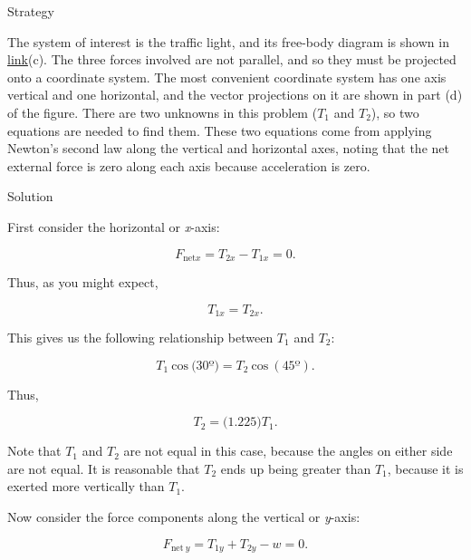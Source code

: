 \documentclass[
]{book}
\newenvironment{tinysection}{}{}
\begin{document}
\begin{tinysection}

{Strategy}

\end{tinysection}

The system of interest is the traffic light, and its free-body diagram
is shown in \protect\hyperlink{import-auto-id3051538}{link}(c).
The three forces involved are not parallel, and so they must be
projected onto a coordinate system. The most convenient coordinate
system has one axis vertical and one horizontal, and the vector
projections on it are shown in part (d) of the figure. There are two
unknowns in this problem (\(T_{1}{}\) and \(T_{2}{}\)), so two equations are
needed to find them. These two equations come from applying Newton's
second law along the vertical and horizontal axes, noting that the net
external force is zero along each axis because acceleration is zero.

\begin{tinysection}

{Solution}

\end{tinysection}

First consider the horizontal or \emph{x}-axis:

\leavevmode\hypertarget{eip-id2514755}{}%
\[{{F_{\text{net}x} = {T_{\text{2}x} - T_{\text{1}x}}} = 0}.\]

Thus, as you might expect,

\leavevmode\hypertarget{eip-id2540452}{}%
\[{T_{\text{1}x} = T_{\text{2}x}}.\]

This gives us the following relationship between \(T_{1}{}\) and
\(T_{2}{}\):

\leavevmode\hypertarget{eip-id2122298}{}%
\[{T_{1}\ \text{cos}\ (\text{30º}{) = T_{2}}\ \text{cos}\ (\text{45º})}.\]

Thus,

\leavevmode\hypertarget{eip-id2577136}{}%
\[{{T_{2} = (}1\text{.}\text{225})T_{1}}.\]

Note that \(T_{1}{}\) and \(T_{2}{}\) are not equal in this case, because
the angles on either side are not equal. It is reasonable that \(T_{2}{}\)
ends up being greater than \(T_{1}{}\), because it is exerted more
vertically than \(T_{1}{}\).

Now consider the force components along the vertical or \emph{y}-axis:

\leavevmode\hypertarget{eip-id2308230}{}%
\[{{F_{\text{net}\ y} = {{T_{\text{1}y} + T_{\text{2}y}} - w}} = 0}.\]
\end{document}

